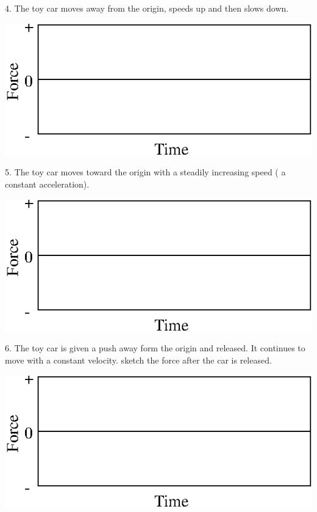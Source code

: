 4. The toy car moves away from the origin, speeds up and then slows down.

\vspace{0.3cm}
{\par\centering \includegraphics{force2/force2_fig7.eps} \par}
\vspace{0.3cm}

5. The toy car moves toward the origin with a steadily increasing speed ( a
constant acceleration).

\vspace{0.3cm}
{\par\centering \includegraphics{force2/force2_fig7.eps} \par}
\vspace{0.3cm}

6. The toy car is given a push away form the origin and released. It continues
to move with a constant velocity. sketch the force after the car is released.

\vspace{0.3cm}
{\par\centering \includegraphics{force2/force2_fig7.eps} \par}
\vspace{1.3cm}

